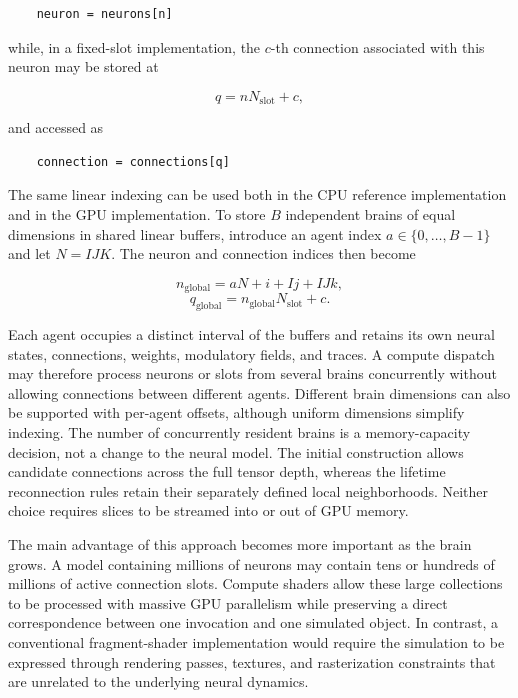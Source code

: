 \documentclass[12pt,a4paper]{article}
\begin{document}
	\begin{verbatim}
	neuron = neurons[n]
	\end{verbatim}

	while, in a fixed-slot implementation, the $c$-th connection associated with this neuron may be stored at

	$$q = nN_{\mathrm{slot}} + c,$$

	and accessed as

	\begin{verbatim}
	connection = connections[q]
	\end{verbatim}

	The same linear indexing can be used both in the CPU reference implementation and in the GPU implementation. To store $B$ independent brains of equal dimensions in shared linear buffers, introduce an agent index $a\in\{0,\ldots,B-1\}$ and let $N=IJK$. The neuron and connection indices then become

	$$n_{\mathrm{global}}=aN+i+Ij+IJk,$$
	$$q_{\mathrm{global}}=n_{\mathrm{global}}N_{\mathrm{slot}}+c.$$

	Each agent occupies a distinct interval of the buffers and retains its own neural states, connections, weights, modulatory fields, and traces. A compute dispatch may therefore process neurons or slots from several brains concurrently without allowing connections between different agents. Different brain dimensions can also be supported with per-agent offsets, although uniform dimensions simplify indexing. The number of concurrently resident brains is a memory-capacity decision, not a change to the neural model. The initial construction allows candidate connections across the full tensor depth, whereas the lifetime reconnection rules retain their separately defined local neighborhoods. Neither choice requires slices to be streamed into or out of GPU memory.

	The main advantage of this approach becomes more important as the brain grows. A model containing millions of neurons may contain tens or hundreds of millions of active connection slots. Compute shaders allow these large collections to be processed with massive GPU parallelism while preserving a direct correspondence between one invocation and one simulated object. In contrast, a conventional fragment-shader implementation would require the simulation to be expressed through rendering passes, textures, and rasterization constraints that are unrelated to the underlying neural dynamics.
\end{document}
